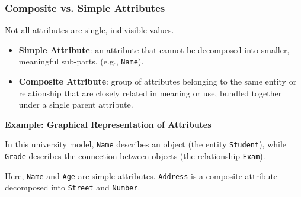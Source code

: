 \subsubsection{Composite vs. Simple Attributes}
Not all attributes are single, indivisible values.

\begin{itemize}
    \item \textbf{Simple Attribute}: 
an attribute that cannot be decomposed into smaller, meaningful sub-parts. (e.g., \texttt{Name}).

\vs

\item \textbf{Composite Attribute}: 
 group of attributes belonging to the same entity or relationship that are closely related in meaning or use, bundled together under a single parent attribute.
\end{itemize}



\vspace{0.2cm}
\begin{example}{\textbf{Example: Graphical Representation of Attributes}}

    In this university model, \texttt{Name} describes an object (the entity \texttt{Student}), while \texttt{Grade} describes the connection between objects (the relationship \texttt{Exam}).
\vspace{0.2cm}

\begin{center}
\end{center}

\vs
Here, \texttt{Name} and \texttt{Age} are simple attributes. \texttt{Address} is a composite attribute decomposed into \texttt{Street} and \texttt{Number}.
\end{example}

